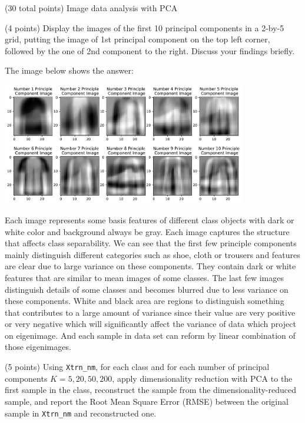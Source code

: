 \documentclass[12pt]{article}
\begin{document}
\begin{question}{(30 total points) Image data analysis with PCA}
\begin{subquestion}
   \end{subquestion}

   \begin{subquestion}{(4 points)
      Display the images of the first 10 principal components in
      a 2-by-5 grid, putting the image of 1st principal component on
      the top left corner, followed by the one of 2nd component to the right.
      Discuss your findings briefly.
     } \label{Q1.disp.pca}
   

      \begin{answerbox}{35em}
         The image below shows the answer:
         \begin{center}
         \includegraphics[width=0.8\textwidth]{PCA2.pdf}
         \end{center}
         Each image represents some basis features of different class objects with dark or white color and background always be gray. Each image captures the structure that affects class separability. We can see that the first few principle components mainly distinguish different categories such as shoe, cloth or trousers and features are clear due to large variance on these components. They contain dark or white features that are similar to mean images of some classes. The last few images distinguish details of some classes and becomes blurred due to less variance on these components. White and black area are regions to distinguish something that contributes to a large amount of variance since their value are very positive or very negative which will significantly affect the variance of data which project on eigenimage. And each sample in data set can reform by linear combination of those eigenimages.
      \end{answerbox}
  


   \end{subquestion}

   \begin{subquestion}{(5 points)
       Using \texttt{Xtrn\_nm}, 
       for each class and for each number of principal components $K =
       5, 20, 50, 200$, apply dimensionality reduction with PCA to the
       first sample in the class, reconstruct the sample from the
       dimensionality-reduced sample, and 
       report the Root Mean Square Error (RMSE) between the
       original sample in {\tt Xtrn\_nm} and reconstructed one.
     } \label{Q1.6}


\end{subquestion}
\end{question}
\end{document}
